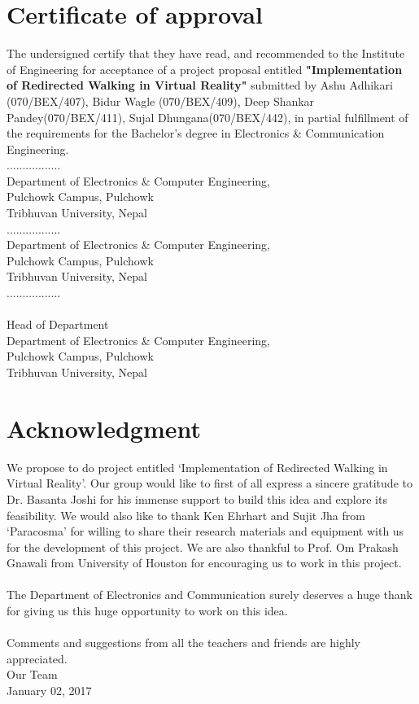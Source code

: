 \documentclass[12pt]{article}
\begin{document}



\section*{Certificate of approval}
\par
The  undersigned  certify  that  they  have  read,  and  recommended  to  the  Institute  of Engineering  for acceptance of a project proposal entitled \textbf{"Implementation of Redirected Walking in Virtual Reality"} submitted by Ashu Adhikari (070/BEX/407), Bidur Wagle (070/BEX/409), Deep Shankar Pandey(070/BEX/411), Sujal Dhungana(070/BEX/442),  in partial fulfillment  of  the  requirements  for  the  Bachelor’s degree in Electronics \& Communication Engineering.  \\[2cm]
................. \\
Department of Electronics \& Computer Engineering,
\\Pulchowk Campus, Pulchowk
\\Tribhuvan University, Nepal \\[1cm]
................. \\
Department of Electronics \& Computer Engineering,
\\Pulchowk Campus, Pulchowk
\\Tribhuvan University, Nepal \\[1cm]
................. \\
\\Head of Department
\\Department of Electronics \& Computer Engineering,
\\Pulchowk Campus, Pulchowk
\\Tribhuvan University, Nepal \\[1cm]

\clearpage


\section*{Acknowledgment}

We propose to do project entitled ‘Implementation of Redirected Walking in Virtual Reality’. Our group would like to first of all express a sincere gratitude to Dr. Basanta Joshi for his immense support to build this idea and explore its feasibility. We would also like to thank Ken Ehrhart and Sujit Jha from ‘Paracosma’ for willing to share their research materials and equipment with us for the development of this project. We are also thankful to Prof. Om Prakash Gnawali from University of Houston for encouraging us to work in this project.\\
\\
The Department of Electronics and Communication surely deserves a huge thank for giving us this huge opportunity to work on this idea.\\
\\
Comments and suggestions from all the teachers and friends are highly appreciated.
\\[1cm]
Our Team
\\January 02, 2017
\clearpage
\end{document}
